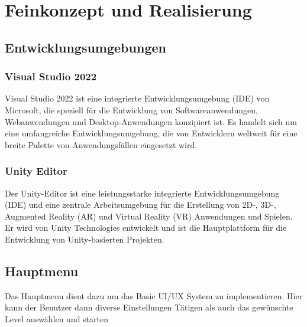 



\chapter{Feinkonzept und Realisierung}

\section{Entwicklungsumgebungen}
\subsection{Visual Studio 2022}
Visual Studio 2022 ist eine integrierte Entwicklungsumgebung (IDE) von Microsoft, die speziell für die Entwicklung von
Softwareanwendungen, Webanwendungen und Desktop-Anwendungen konzipiert ist. Es handelt sich um eine umfangreiche
Entwicklungsumgebung, die von Entwicklern weltweit für eine breite Palette von Anwendungsfällen eingesetzt wird.

\subsection{Unity Editor}
Der Unity-Editor ist eine leistungsstarke integrierte Entwicklungsumgebung (IDE) und eine zentrale Arbeitsumgebung
für die Erstellung von 2D-, 3D-, Augmented Reality (AR) und Virtual Reality (VR) Anwendungen und Spielen. Er wird von
Unity Technologies entwickelt und ist die Hauptplattform für die Entwicklung von Unity-basierten Projekten.

\section{Hauptmenu}
Das Hauptmenu dient dazu um das Basic UI/UX System zu implementieren.
Hier kann der Benutzer dann diverse Einstellungen Tätigen als auch
das gewünschte Level auswählen und starten

